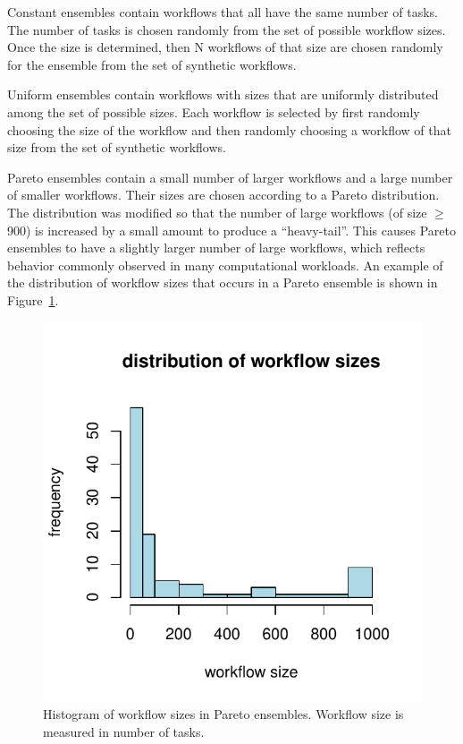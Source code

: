\documentclass[preprint,5p]{elsarticle}
\begin{document}
Constant ensembles contain workflows that all have the same number of tasks. 
The number of tasks is chosen randomly from the set of
possible workflow sizes. Once the size is determined, then N workflows of that
size are chosen randomly for the ensemble from the set of synthetic workflows.

Uniform ensembles contain workflows with sizes that are uniformly distributed
among the set of possible sizes. Each workflow 
is selected by first randomly choosing the size of the workflow
and then randomly choosing a workflow of that size from the set of
synthetic workflows.

Pareto ensembles contain a small number of larger workflows and a large number
of smaller workflows. Their sizes  
are chosen according to a Pareto distribution. The distribution was modified so
that the number of large workflows (of size $\geq$ 900) is increased by a small amount to
produce a ``heavy-tail''. This causes Pareto ensembles to have a slightly larger
number of large workflows, which reflects behavior commonly observed in many
computational workloads. 
An example of the distribution of workflow sizes that
occurs in a Pareto ensemble is shown in Figure~\ref{fig:ensemble-pareto}.

\begin{figure}[t] 
    \centering
    \includegraphics[width=0.6\columnwidth]{figures/ensemble-pareto}
    \caption[Histogram of workflow sizes in Pareto ensembles]{Histogram of
    workflow sizes in Pareto ensembles. Workflow size is measured in number of
    tasks.}
    \label{fig:ensemble-pareto}
\end{figure}
\end{document}
